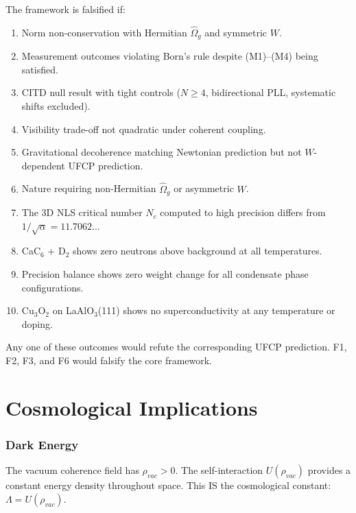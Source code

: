 \documentclass[11pt, a4paper]{article}
\begin{document}
The framework is falsified if:

\begin{enumerate}[label=F\arabic*.]
  \item Norm non-conservation with Hermitian $\hat{\Omega}_g$ and
        symmetric $W$.
  \item Measurement outcomes violating Born's rule despite
        (M1)--(M4) being satisfied.
  \item CITD null result with tight controls ($N \geq 4$,
        bidirectional PLL, systematic shifts excluded).
  \item Visibility trade-off not quadratic under coherent coupling.
  \item Gravitational decoherence matching Newtonian prediction
        but not $W$-dependent UFCP prediction.
  \item Nature requiring non-Hermitian $\hat{\Omega}_g$ or
        asymmetric $W$.
  \item The 3D NLS critical number $N_c$ computed to high precision
        differs from $1/\sqrt{\alpha} = 11.7062\ldots$
  \item CaC$_6$ + D$_2$ shows zero neutrons above background at
        all temperatures.
  \item Precision balance shows zero weight change for all
        condensate phase configurations.
  \item Cu$_3$O$_2$ on LaAlO$_3$(111) shows no superconductivity
        at any temperature or doping.
\end{enumerate}

Any one of these outcomes would refute the corresponding UFCP
prediction. F1, F2, F3, and F6 would falsify the core framework.

\newpage

\part{Cosmological Implications}

\section{Dark Energy}

The vacuum coherence field has $\rho_{vac} > 0$. The
self-interaction $U(\rho_{vac})$ provides a constant energy
density throughout space. This IS the cosmological constant:
$\Lambda = U(\rho_{vac})$.
\end{document}
